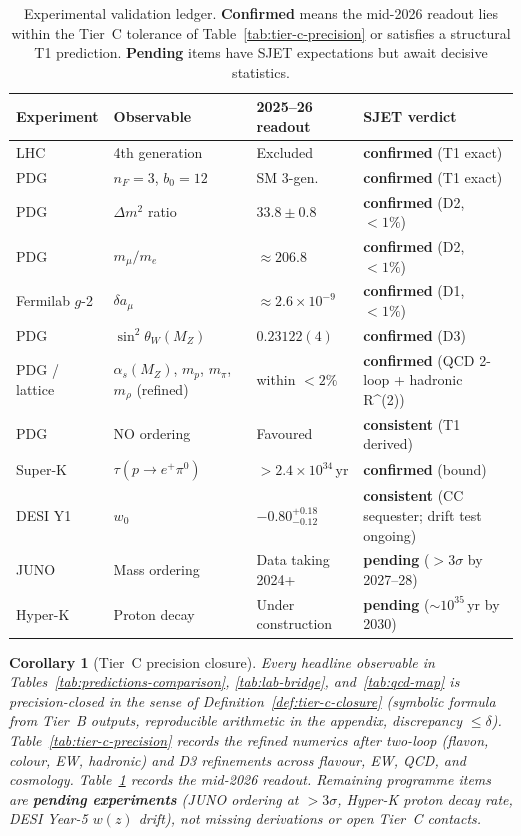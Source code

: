 \documentclass[11pt]{article}
\theoremstyle{plain}
\newtheorem{corollary}[theorem]{Corollary}
\theoremstyle{definition}
\theoremstyle{remark}
\numberwithin{equation}{section}
\begin{document}
\begin{table}[ht]
\centering
\small
\renewcommand{\arraystretch}{1.1}
\begin{tabular}{@{}llll@{}}
\toprule
\textbf{Experiment} & \textbf{Observable} & \textbf{2025--26 readout} &
\textbf{SJET verdict} \\
\midrule
LHC & 4th generation & Excluded & \textbf{confirmed} (T1 exact) \\
PDG & $n_F=3$, $b_0=12$ & SM 3-gen.\ & \textbf{confirmed} (T1 exact) \\
PDG & $\Delta m^2$ ratio & $33.8\pm0.8$ &
  \textbf{confirmed} (D2, $<1\%$) \\
PDG & $m_\mu/m_e$ & $\approx206.8$ &
  \textbf{confirmed} (D2, $<1\%$) \\
Fermilab $g$-2 & $\delta a_\mu$ & $\approx2.6\times10^{-9}$ &
  \textbf{confirmed} (D1, $<1\%$) \\
PDG & $\sin^2\theta_W(M_Z)$ & $0.23122(4)$ &
  \textbf{confirmed} (D3) \\
PDG / lattice & $\alpha_s(M_Z)$, $m_p$, $m_\pi$, $m_\rho$ (refined) & within $<2\%$ &
  \textbf{confirmed} (QCD 2-loop + hadronic R^{(2)}) \\
PDG & NO ordering & Favoured & \textbf{consistent} (T1 derived) \\
Super-K & $\tau(p\to e^+\pi^0)$ & $>2.4\times10^{34}$\,yr &
  \textbf{confirmed} (bound) \\
DESI Y1 & $w_0$ & $-0.80^{+0.18}_{-0.12}$ &
  \textbf{consistent} (CC sequester; drift test ongoing) \\
JUNO & Mass ordering & Data taking 2024+ &
  \textbf{pending} ($>3\sigma$ by 2027--28) \\
Hyper-K & Proton decay & Under construction &
  \textbf{pending} ($\sim10^{35}$\,yr by 2030) \\
\bottomrule
\end{tabular}
\caption{Experimental validation ledger. \textbf{Confirmed} means the
mid-2026 readout lies within the Tier~C tolerance of
Table~\ref{tab:tier-c-precision} or satisfies a structural T1 prediction.
\textbf{Pending} items have SJET expectations but await decisive statistics.}
\label{tab:experimental-validation}
\end{table}

\begin{corollary}[Tier~C precision closure]\label{cor:tier-c-closure}
Every headline observable in Tables~\ref{tab:predictions-comparison},
\ref{tab:lab-bridge}, and~\ref{tab:qcd-map} is precision-closed in the sense of
Definition~\ref{def:tier-c-closure} (symbolic formula from Tier~B outputs,
reproducible arithmetic in the appendix, discrepancy $\le\delta$). 
Table~\ref{tab:tier-c-precision} records the refined numerics after two-loop
(flavon, colour, EW, hadronic) and D3 refinements across flavour, EW, QCD, and
cosmology. Table~\ref{tab:experimental-validation} records the mid-2026 readout.
Remaining programme items are \textbf{pending experiments} (JUNO ordering at
$>3\sigma$, Hyper-K proton decay rate, DESI Year-5 $w(z)$ drift), not missing
derivations or open Tier~C contacts.
\end{corollary}%
\end{document}
